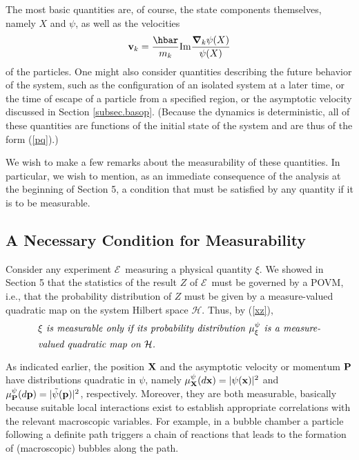 \documentclass[12pt]{article}
\renewcommand{\H}{\mbox{$\mathcal{H}$}}
\newcommand{\E}{\mbox{$\mathscr{E}$}}
\begin{document}
The most basic quantities are, of course, the state components
themselves, namely $X$ and $\psi$, as well as the velocities
\begin{equation}\label{velox}{{\bf v}_k} = \frac{\hbar}{m_k}{\rm
Im}\frac{{\boldsymbol{\nabla}_k}\psi(X)}{\psi(X)}
\end{equation}
of the particles. One might also consider quantities describing the
future behavior of the system, such as the configuration of an
isolated system at a later time, or the time of escape of a particle
{}from a specified region, or the asymptotic velocity discussed in
Section \ref{subsec.basop}. (Because the dynamics is deterministic,
all of these quantities are functions of the initial state of the
system and are thus of the form (\ref{pq}).)

We wish to make a few remarks about the measurability of these
quantities.  In particular, we wish to mention, as an immediate
consequence of the analysis at the beginning of Section 5, a condition
that must be satisfied by any quantity if it is to be measurable.

\subsection{A Necessary Condition for Measurability}

Consider any experiment \E\ measuring a physical quantity $\xi$. We
showed in Section 5 that the statistics of the result $Z$ of \E\ must
be governed by a POVM, i.e., that the probability distribution of $Z$
must be given by a measure-valued quadratic map on the system Hilbert
space \H.  Thus, by (\ref{xz}),
\begin{equation}
\mbox{%
\begin{minipage}{0.85\textwidth}\openup 1.4\jot
   \setlength{\baselineskip}{12pt}\emph{$\xi$ is measurable only if its
     probability distribution $\mu_{\xi}^{\psi}$ is a measure-valued
     quadratic map on \H.  }
\end{minipage}}
\label{MC1}
\end{equation}

As indicated earlier, the position ${\bf X}$ and the asymptotic
velocity or momentum ${\bf P}$ have distributions quadratic in $\psi$,
namely $\mu_{\bf X}^{\psi}(d{\bf x})=|\psi({\bf x})|^2$ and $\mu_{\bf
   P}^{\psi}(d{\bf p})=|\tilde{\psi}({\bf p})|^2$, respectively.
Moreover, they are both measurable, basically because suitable local
interactions exist to establish appropriate correlations with the
relevant macroscopic variables.  For example, in a bubble chamber a
particle following a definite path triggers a chain of reactions that
leads to the formation of (macroscopic) bubbles along the path.
\end{document}
